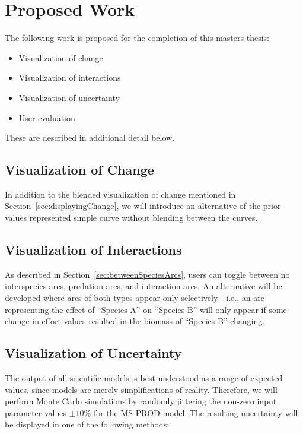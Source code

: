 \chapter{Proposed Work}

The following work is proposed for the completion of this masters thesis:

\begin{itemize}
  \item Visualization of change
  \item Visualization of interactions
  \item Visualization of uncertainty
  \item User evaluation
\end{itemize}

These are described in additional detail below.

\section{Visualization of Change}

In addition to the blended visualization of change mentioned in Section~\ref{sec:displayingChange}, we will introduce an alternative of the prior values represented simple curve without blending between the curves.

\section{Visualization of Interactions}

As described in Section~\ref{sec:betweenSpeciesArcs}, users can toggle between no interspecies arcs, predation arcs, and interaction arcs.  An alternative will be developed where arcs of both types appear only selectively---i.e., an arc representing the effect of ``Species A'' on ``Species B'' will only appear if some change in effort values resulted in the biomass of ``Species B'' changing.

\section{Visualization of Uncertainty}

The output of all scientific models is best understood as a range of expected values, since models are merely simplifications of reality.  Therefore, we will perform Monte Carlo simulations by randomly jittering the non-zero input parameter values $\pm 10\%$ for the MS-PROD model.  The resulting uncertainty will be displayed in one of the following methods:

